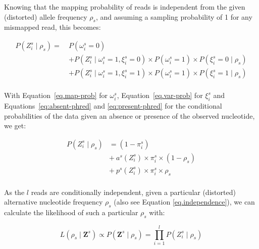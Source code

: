 \documentclass[authoryear,preprint,11pt]{scrartcl}
\newcommand{\Prob}{{P}}
\begin{document}
Knowing that the mapping probability of reads is independent from the given (distorted) allele frequency $\rho_s$, and assuming a sampling probability of 1 for any mismapped read, this becomes:

\begin{equation}
 \begin{split}
  \Prob(Z_i^s \mid \rho_s) =~ &\Prob(\omega_i^s=0) \\
  &+ \Prob(Z_i^s \mid \omega_i^s=1,\xi_i^s=0) \times \Prob(\omega_i^s=1) \times \Prob(\xi_i^s=0 \mid \rho_s) \\
  &+ \Prob(Z_i^s \mid \omega_i^s=1,\xi_i^s=1) \times \Prob(\omega_i^s=1) \times \Prob(\xi_i^s=1 \mid \rho_s) \\
 \end{split}
\end{equation}

With Equation~\ref{eq.map-prob} for $\omega_i^s$, Equation~\ref{eq.var-prob} for $\xi_i^s$ and Equations~\ref{eq:absent-phred} and \ref{eq:present-phred} for the conditional probabilities of the data given an absence or presence of the observed nucleotide, we get:

\begin{equation}
 \label{eq:read_probability}
 \begin{split}
  \Prob(Z_i^s \mid \rho_s) &= (1 - \pi_i^s) \\
  &+~ a^s(Z_i^s)\times \pi_i^s \times (1 - \rho_s) \\
  &+~ p^s(Z_i^s) \times \pi_i^s \times \rho_s \\
 \end{split}
\end{equation}

As the $l$ reads are conditionally independent, given a particular (distorted) alternative nucleotide frequency $\rho_s$ (also see Equation \ref{eq.independence}), we can calculate the likelihood of such a particular $\rho_s$ with:

\begin{equation}
 \label{eq:read-product}
 L(\rho_s \mid\boldsymbol{Z}^s) \propto \Prob(\boldsymbol{Z}^s \mid \rho_s) = \prod_{i=1}^l \Prob(Z_i^s \mid \rho_s)
\end{equation}
\end{document}
